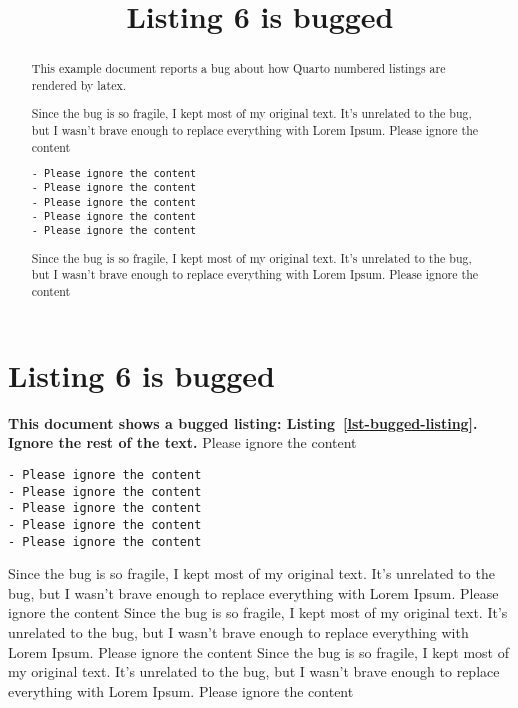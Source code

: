 \documentclass[
  letterpaper,
  DIV=11,
  numbers=noendperiod]{scrartcl}
\title{Listing 6 is bugged}
\author{}
\date{}
\theoremstyle{plain}
\theoremstyle{remark}
\begin{document}
\maketitle
\begin{abstract}
This example document reports a bug about how Quarto numbered listings
are rendered by latex.

Since the bug is so fragile, I kept most of my original text. It's
unrelated to the bug, but I wasn't brave enough to replace everything
with Lorem Ipsum. Please ignore the content

\begin{verbatim}
- Please ignore the content
- Please ignore the content
- Please ignore the content
- Please ignore the content
- Please ignore the content
\end{verbatim}

Since the bug is so fragile, I kept most of my original text. It's
unrelated to the bug, but I wasn't brave enough to replace everything
with Lorem Ipsum. Please ignore the content
\end{abstract}
\ifdefined\Shaded\renewenvironment{Shaded}{\begin{tcolorbox}[borderline west={3pt}{0pt}{shadecolor}, interior hidden, enhanced, frame hidden, sharp corners, boxrule=0pt]}{\end{tcolorbox}}\fi

\hypertarget{listing-6-is-bugged}{%
\section{Listing 6 is bugged}\label{listing-6-is-bugged}}

\textbf{This document shows a bugged listing:
Listing~\ref{lst-bugged-listing}. Ignore the rest of the text.} Please
ignore the content

\begin{verbatim}
- Please ignore the content
- Please ignore the content
- Please ignore the content
- Please ignore the content
- Please ignore the content
\end{verbatim}

Since the bug is so fragile, I kept most of my original text. It's
unrelated to the bug, but I wasn't brave enough to replace everything
with Lorem Ipsum. Please ignore the content Since the bug is so fragile,
I kept most of my original text. It's unrelated to the bug, but I wasn't
brave enough to replace everything with Lorem Ipsum. Please ignore the
content Since the bug is so fragile, I kept most of my original text.
It's unrelated to the bug, but I wasn't brave enough to replace
everything with Lorem Ipsum. Please ignore the content
\end{document}
